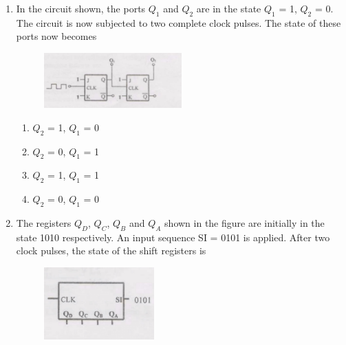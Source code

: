 \documentclass[journal,13pt,onecolumn]{IEEEtran}
\begin{document}
\begin{enumerate}[itemsep = 1em]
\begin{multicols}{4}
\begin{enumerate}
    \item F = Z
    \item F = Z + Y +YX
    \item ZY
    \item XYZ
\end{enumerate} 
\end{multicols}

\item In the circuit shown, the ports $Q_1$ and $Q_2$ are in the state $Q_1$ = 1, $Q_2$ = 0. The circuit is now subjected to two complete clock pulses. The state of these ports now becomes

\hfill{}

\begin{figure}[ht!]
    \centering
    \includegraphics[width=0.5\textwidth]{fig7.jpeg}
    \caption{}
    \label{fig:fig7.jpeg}
\end{figure}

\begin{multicols}{4}
\begin{enumerate}
    \item $Q_2$ = 1, $Q_1$ = 0
    \item $Q_2$ = 0, $Q_1$ = 1
    \item $Q_2$ = 1, $Q_1$ = 1
    \item $Q_2$ = 0, $Q_1$ = 0
\end{enumerate} 
\end{multicols}

\vspace{4em}

\item The registers $Q_D$, $Q_C$, $Q_B$ and $Q_A$ shown in the figure are initially in the state 1010 respectively. An input sequence SI = 0101 is applied. After two clock pulses, the state of the shift registers is

\hfill{}

\begin{figure}[ht!]
    \centering
    \includegraphics[width=0.4\textwidth]{fig8.jpeg}
    \caption{}
    \label{fig:fig8.jpeg}
\end{figure}


\end{enumerate}
\end{document}
